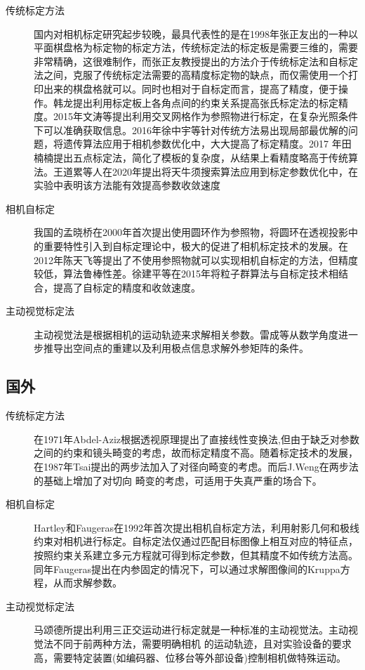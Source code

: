 \documentclass{article}
\begin{document}
\begin{description}
	\item[传统标定方法] 国内对相机标定研究起步较晚，最具代表性的是在1998年张正友出的一种以平面棋盘格为标定物的标定方法，传统标定法的标定板是需要三维的，需要非常精确，这很难制作，而张正友教授提出的方法介于传统标定法和自标定法之间，克服了传统标定法需要的高精度标定物的缺点，而仅需使用一个打印出来的棋盘格就可以。同时也相对于自标定而言，提高了精度，便于操作。韩龙提出利用标定板上各角点间的约束关系提高张氏标定法的标定精度。2015年文涛等提出利用交叉网格作为参照物进行标定，在复杂光照条件下可以准确获取信息。2016年徐中宇等针对传统方法易出现局部最优解的问题，将遗传算法应用于相机参数优化中，大大提高了标定精度。2017 年田楠楠提出五点标定法，简化了模板的复杂度，从结果上看精度略高于传统算法。王道累等人在2020年提出将天牛须搜索算法应用到标定参数优化中，在实验中表明该方法能有效提高参数收敛速度
	
	\item[相机自标定] 我国的孟晓桥在2000年首次提出使用圆环作为参照物，将圆环在透视投影中的重要特性引入到自标定理论中，极大的促进了相机标定技术的发展。在2012年陈天飞等提出了不使用参照物就可以实现相机自标定的方法，但精度较低，算法鲁棒性差。徐建平等在2015年将粒子群算法与自标定技术相结合，提高了自标定的精度和收敛速度。	
	
	\item[主动视觉标定法] 主动视觉法是根据相机的运动轨迹来求解相关参数。雷成等从数学角度进一步推导出空间点的重建以及利用极点信息求解外参矩阵的条件。
\end{description}



\subsection{国外}
\begin{description}
	\item[传统标定方法] 在1971年Abdel-Aziz根据透视原理提出了直接线性变换法,但由于缺乏对参数之间的约束和镜头畸变的考虑，故而标定精度不高。随着标定技术的发展，在1987年Tsai提出的两步法加入了对径向畸变的考虑。而后J.Weng在两步法的基础上增加了对切向
	畸变的考虑，可适用于失真严重的场合下。
	
	\item[相机自标定] Hartley和Faugeras在1992年首次提出相机自标定方法，利用射影几何和极线约束对相机进行标定。自标定法仅通过匹配目标图像上相互对应的特征点，按照约束关系建立多元方程就可得到标定参数，但其精度不如传统方法高。同年Faugeras提出在内参固定的情况下，可以通过求解图像间的Kruppa方程，从而求解参数。
		
	\item[主动视觉标定法] 马颂德所提出利用三正交运动进行标定就是一种标准的主动视觉法。主动视觉法不同于前两种方法，需要明确相机
	的运动轨迹，且对实验设备的要求高，需要特定装置(如编码器、位移台等外部设备)控制相机做特殊运动。
	
\end{description}
\end{document}
